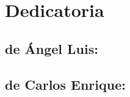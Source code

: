 \section*{Dedicatoria}
\subsection*{de Ángel Luis:}
\lipsum[1]
\subsection*{de Carlos Enrique:}
\lipsum[1]